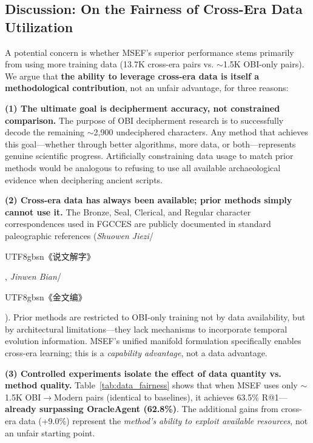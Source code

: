 \documentclass{article}
\newcommand{\cg}[1]{\begin{CJK*}{UTF8}{gbsn}#1\end{CJK*}}
\begin{document}
\subsection{Discussion: On the Fairness of Cross-Era Data Utilization}
\label{app:fairness_discussion}

A potential concern is whether MSEF's superior performance stems primarily from using more training data (13.7K cross-era pairs vs. $\sim$1.5K OBI-only pairs). We argue that \textbf{the ability to leverage cross-era data is itself a methodological contribution}, not an unfair advantage, for three reasons:

\textbf{(1) The ultimate goal is decipherment accuracy, not constrained comparison.} The purpose of OBI decipherment research is to successfully decode the remaining $\sim$2,900 undeciphered characters. Any method that achieves this goal---whether through better algorithms, more data, or both---represents genuine scientific progress. Artificially constraining data usage to match prior methods would be analogous to refusing to use all available archaeological evidence when deciphering ancient scripts.

\textbf{(2) Cross-era data has always been available; prior methods simply cannot use it.} The Bronze, Seal, Clerical, and Regular character correspondences used in FGCCES are publicly documented in standard paleographic references (\textit{Shuowen Jiezi}/\cg{《说文解字》}, \textit{Jinwen Bian}/\cg{《金文编》}). Prior methods are restricted to OBI-only training not by data availability, but by architectural limitations---they lack mechanisms to incorporate temporal evolution information. MSEF's unified manifold formulation specifically enables cross-era learning; this is a \textit{capability advantage}, not a data advantage.

\textbf{(3) Controlled experiments isolate the effect of data quantity vs. method quality.} Table~\ref{tab:data_fairness} shows that when MSEF uses only $\sim$1.5K OBI$\to$Modern pairs (identical to baselines), it achieves 63.5\% R@1---\textbf{already surpassing OracleAgent (62.8\%)}. The additional gains from cross-era data (+9.0\%) represent the \textit{method's ability to exploit available resources}, not an unfair starting point.
\end{document}
